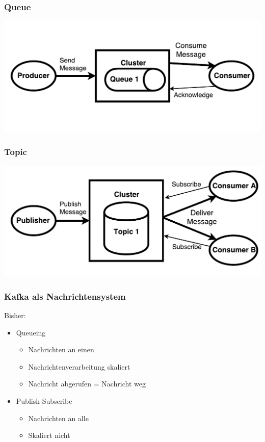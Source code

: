 
\begin{frame}
\frametitle{Queue}
\begin{center}
	\centering
	\includegraphics[scale=0.6]{figure/queue_draw.pdf}
\end{center}
\end{frame}

\begin{frame}
\frametitle{Topic}
	\centering
	\includegraphics[scale=0.6]{figure/topic_draw.pdf}
\end{frame}

\begin{frame}
\frametitle{Kafka als Nachrichtensystem}

Bisher: 
\begin{itemize}
	\item Queueing
	\begin{itemize}
		\item Nachrichten an einen
		\item Nachrichtenverarbeitung skaliert
		\item Nachricht abgerufen = Nachricht weg
	\end{itemize}
	\item Publish-Subscribe
	\begin{itemize}
		\item Nachrichten an alle
		\item Skaliert nicht  			%
	\end{itemize}
\end{itemize}

\end{frame}

